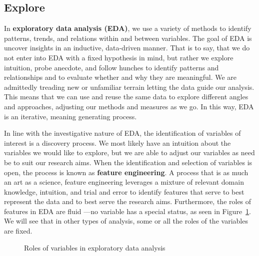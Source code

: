 \documentclass[
  letterpaper,
  krantz1]{latex/krantz-mod}
\theoremstyle{definition}
\theoremstyle{definition}
\theoremstyle{remark}
\begin{document}
\subsection{Explore}\label{sec-analysis-explore}

In \textbf{exploratory data analysis
(EDA)}, we use a variety of
methods to identify patterns, trends, and relations within and between
variables. The goal of EDA is uncover insights in an inductive,
data-driven manner. That is to say, that we
do not enter into EDA with a fixed hypothesis in mind, but rather we
explore intuition, probe anecdote, and follow hunches to identify
patterns and relationships and to evaluate whether and why they are
meaningful. We are admittedly treading new or unfamiliar terrain letting
the data guide our analysis. This means that we can use and reuse the
same data to explore different angles and approaches, adjusting our
methods and measures as we go. In this way, EDA is an iterative, meaning
generating process.

In line with the investigative nature of EDA, the identification of
variables of interest is a discovery process.
We most likely have an intuition about the variables we would like to
explore, but we are able to adjust our variables as need be to suit our
research aims. When the identification and selection of variables is
open, the process is known as \textbf{feature
engineering}. A process that is as much an
art as a science, feature engineering leverages a mixture of relevant
domain knowledge, intuition, and trial and error
to identify features that serve to best represent the data and to best
serve the research aims. Furthermore, the roles of features in EDA are
fluid ---no variable has a special status, as seen in
Figure~\ref{fig-eda-variables}. We will see that in other types of
analysis, some or all the roles of the variables are fixed.

\begin{figure}[!htb]


\caption{\label{fig-eda-variables}Roles of variables in exploratory data
analysis}

\end{figure}%
\end{document}

